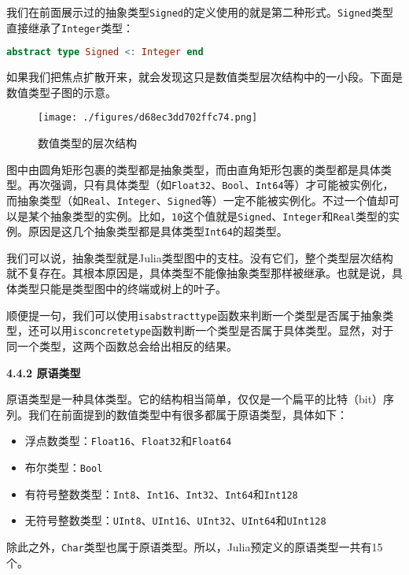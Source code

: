 我们在前面展示过的抽象类型\verb|Signed|的定义使用的就是第二种形式。\verb|Signed|类型直接继承了\verb|Integer|类型：

\begin{lstlisting}[language=julia]
abstract type Signed <: Integer end
\end{lstlisting}

如果我们把焦点扩散开来，就会发现这只是数值类型层次结构中的一小段。下面是数值类型子图的示意。

\begin{figure}[ht]
\centering
\texttt{[image: ./figures/d68ec3dd702ffc74.png]}
\caption{数值类型的层次结构} \label{fig_JuC4S4_1}
\end{figure}

图中由圆角矩形包裹的类型都是抽象类型，而由直角矩形包裹的类型都是具体类型。再次强调，只有具体类型（如\verb|Float32|、\verb|Bool|、\verb|Int64|等）才可能被实例化，而抽象类型（如\verb|Real|、\verb|Integer|、\verb|Signed|等）一定不能被实例化。不过一个值却可以是某个抽象类型的实例。比如，\verb|10|这个值就是\verb|Signed|、\verb|Integer|和\verb|Real|类型的实例。原因是这几个抽象类型都是具体类型\verb|Int64|的超类型。

我们可以说，抽象类型就是Julia类型图中的支柱。没有它们，整个类型层次结构就不复存在。其根本原因是，具体类型不能像抽象类型那样被继承。也就是说，具体类型只能是类型图中的终端或树上的叶子。

顺便提一句，我们可以使用\verb|isabstracttype|函数来判断一个类型是否属于抽象类型，还可以用\verb|isconcretetype|函数判断一个类型是否属于具体类型。显然，对于同一个类型，这两个函数总会给出相反的结果。

\textbf{4.4.2 原语类型}

原语类型是一种具体类型。它的结构相当简单，仅仅是一个扁平的比特（bit）序列。我们在前面提到的数值类型中有很多都属于原语类型，具体如下：

\begin{itemize}
\item 浮点数类型：\verb|Float16|、\verb|Float32|和\verb|Float64|
\item 布尔类型：\verb|Bool|
\item 有符号整数类型：\verb|Int8|、\verb|Int16|、\verb|Int32|、\verb|Int64|和\verb|Int128|
\item 无符号整数类型：\verb|UInt8|、\verb|UInt16|、\verb|UInt32|、\verb|UInt64|和\verb|UInt128|
\end{itemize}

除此之外，\verb|Char|类型也属于原语类型。所以，Julia预定义的原语类型一共有15个。

